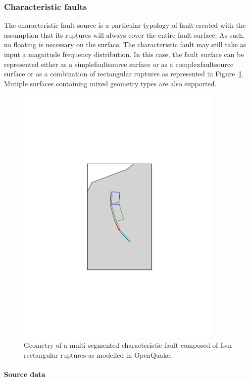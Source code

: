 \subsubsection{Characteristic faults}
\label{desc_characteristic_fault}

The characteristic fault source is a particular typology of fault created
with the assumption that its ruptures will always cover the entire fault
surface. As such, no floating is necessary on the surface. The characteristic fault may still take as input a magnitude frequency distribution. In this case, the fault surface can be represented either as a \gls{simplefaultsource} surface or as a \gls{complexfaultsource} surface or as a combination of rectangular ruptures as represented in
Figure~\ref{fig:char_fault_source}. Mutiple surfaces containing mixed geometry types are also supported. 


\begin{figure}[htb]
\centering
\includegraphics[trim=5cm 7cm 5cm 7cm, clip, width=10cm]{figures/hazard/multi_surface.pdf}
\caption{Geometry of a multi-segmented characteristic fault composed of four
         rectangular ruptures as modelled in OpenQuake.}
\label{fig:char_fault_source}
\end{figure}

\paragraph{Source data}


